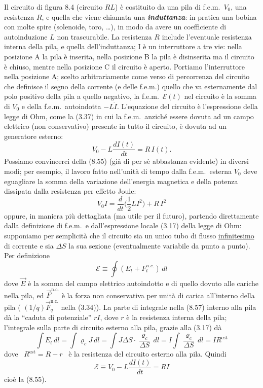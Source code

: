 Il circuito di figura 8.4 (circuito $RL$) \`e costituito da una pila di
f.e.m.\ $V_0$, una resistenza $R$, e quella che viene chiamata una
\textbf{\textit{induttanza}}: in pratica una bobina con molte spire (solenoide,
toro, \dots), in modo da avere un coefficiente di autoinduzione $L$ non
trascurabile. La resistenza $R$ include l'eventuale resistenza interna della
pila, e quella dell'induttanza; I \`e un interruttore a tre vie: nella posizione
A la pila \`e inserita, nella posizione B la pila \`e disinserita ma il circuito
\`e chiuso, mentre nella posizione C il circuito \`e aperto.
Portiamo l'interruttore nella posizione A; scelto arbitrariamente come verso di
percorrenza del circuito che definisce il segno della corrente (e delle f.e.m.)
quello che va esternamente dal polo positivo della pila a quello negativo, la
f.e.m.\ $\mathcal E(t)$ nel circuito \`e la somma di $V_0$ e della
f.e.m.\ autoindotta $-L\dot I$. L'equazione del circuito \`e l'espressione della
legge di Ohm, come la (3.37) in cui la f.e.m.\ anzich\'e essere dovuta ad un
campo elettrico (non conservativo) presente in tutto il circuito, \`e dovuta ad
un generatore esterno:
\begin{equation}
  V_0-L\frac{dI(t)}{dt}=R\,I(t).
  \tag{8.55}
\end{equation}
Possiamo convincerci della (8.55) (gi\`a di per s\`e abbastanza evidente) in
diversi modi; per esempio, il lavoro fatto nell'unit\`a di tempo dalla
f.e.m.\ esterna $V_0$ deve eguagliare la
somma della variazione dell'energia magnetica e della potenza dissipata dalla
resistenza per effetto Joule:
\begin{equation}
  V_0I=\frac{d}{dt}\Big(\frac{1}{2}LI^2\Big)+R\,I^2
  \tag{8.56}
\end{equation}
oppure, in maniera pi\`u dettagliata (ma utile per il futuro), partendo
direttamente dalla definizione di f.e.m.\ e dall'espressione locale (3.17) della
legge di Ohm: supponiamo per semplicit\`a che il circuito sia un unico tubo di
flusso \underline{infinitesimo} di corrente e sia $\Delta S$ la sua sezione
(eventualmente variabile da punto a punto). Per definizione
\begin{equation}
  \mathcal E\equiv\oint(E_t+F_t^{n.c.})\,dl
  \tag{8.57}
\end{equation}
dove $\vec E$ \`e la somma del campo elettrico autoindotto e di quello dovuto
alle cariche nella pila, ed $\vec F^\mathrm{n.c.}$ \`e la forza non conservativa
per unit\`a di carica all'interno della pila \big( $(1/q)\vec F_q^\mathrm{n.c.}$
nella (3.34)\big). La parte di integrale nella (8.57) interno alla pila d\`a la
``caduta di potenziale'' $rI$, dove $r$ \`e la resistenza interna della pila;
l'integrale sulla parte di circuito esterno alla pila, grazie alla (3.17) d\`a
\begin{equation}
  \int E_t\,dl=\int\varrho_cJ\,dl
  =\int J\Delta S\cdot\frac{\varrho_c}{\Delta S}\,dl
  =I\int\frac{\varrho_c}{\Delta S}\,dl=IR^\mathrm{est}
  \tag{8.58}
\end{equation}
dove \ $R^\mathrm{est}=R-r$ \ \`e la resistenza del circuito esterno alla pila.
Quindi
\[
  \mathcal E\equiv V_0-L\frac{dI(t)}{dt}=RI
\]
cio\`e la (8.55).

